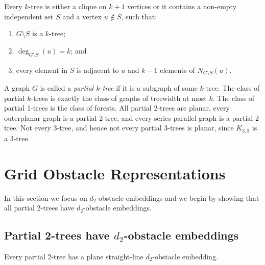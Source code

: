\documentclass{patmorin}
\begin{document}
\begin{lem}
   Every $k$-tree is either a clique on $k+1$ vertices or it contains a non-empty independent set $S$ and a vertex $u\not\in S$, such that:
\begin{enumerate}
   \item $G\setminus S$ is a $k$-tree;
   \item $\deg_{G\setminus S}(u)=k$; and 
   \item every element in $S$ is adjacent to $u$ and $k-1$ elements of
   $N_{G\setminus S}(u)$.
\end{enumerate}
\end{lem}

A graph $G$ is called a \emph{partial $k$-tree} if it is a subgraph of
some $k$-tree.  The class of partial $k$-trees is exactly the class of
graphs of treewidth at most $k$.  The class of partial 1-trees is the
class of forests.  All partial 2-trees are planar, every outerplanar graph
is a partial 2-tree, and every series-parallel graph is a partial 2-tree.
Not every 3-tree, and hence not every partial 3-trees is planar, since
$K_{3,3}$ is a 3-tree.


\section{Grid Obstacle Representations}

In this section we focus on $d_2$-obstacle embeddings and we begin by showing that all partial 2-trees have $d_2$-obstacle embeddings.

\subsection{Partial 2-trees have $d_2$-obstacle embeddings}

\begin{thm}
  Every partial 2-tree has a plane straight-line $d_2$-obstacle embedding.
\end{thm}
\end{document}
